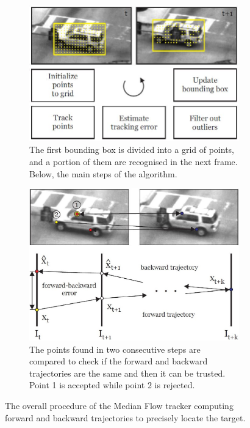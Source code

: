 \begin{figure}[!h]
	\centering
	\begin{subfigure}{0.49\textwidth}
		\includegraphics[width=\linewidth]{images/tracking/howItWorks_medianFlow_points}
		\captionsetup{margin=0.5cm}
		\caption{The first bounding box is divided into a grid of points, and a portion of them are recognised in the next frame. Below, the main steps of the algorithm.}
		\label{fig:howItWorks_medianFlow_points}
	\end{subfigure}
	\begin{subfigure}{0.49\textwidth}
		\includegraphics[width=\linewidth]{images/tracking/howItWorks_medianFlow_trajectory}
		\captionsetup{margin=0.5cm}
		\caption{The points found in two consecutive steps are compared to check if the forward and backward trajectories are the same and then it can be trusted.\\ Point 1 is accepted while point 2 is rejected.}
		\label{fig:howItWorks_medianFlow_trajectory}
	\end{subfigure}
	\captionsetup{margin=0.5cm}
	\caption[The key principle of the Median Flow tracker algorithm.]{The overall procedure of the Median Flow tracker computing forward and backward trajectories to precisely locate the target.}
	\label{fig:howItWorks_medianFlow}
\end{figure}


